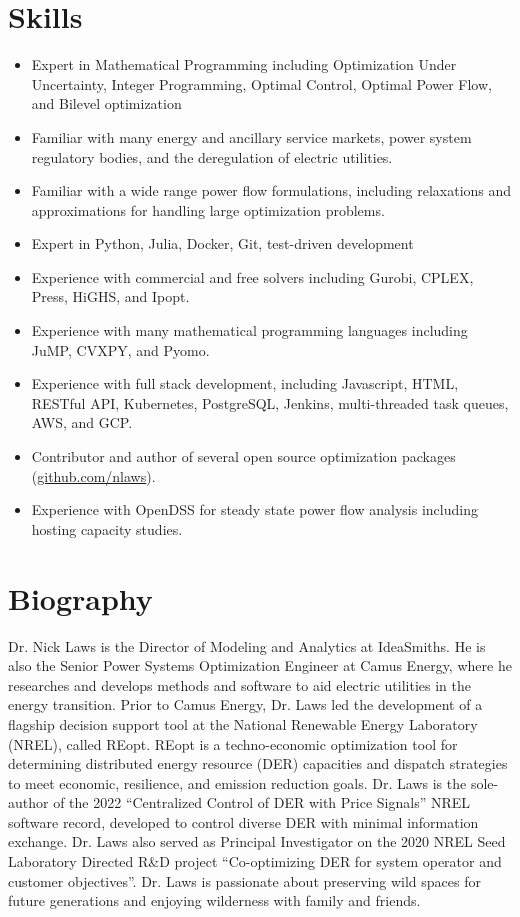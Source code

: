 \documentclass[a4paper,12pt]{report}
\begin{document}
\section*{Skills}
\begin{itemize}
    \item Expert in Mathematical Programming including Optimization Under Uncertainty, Integer Programming, Optimal Control, Optimal Power Flow, and Bilevel optimization
    \item Familiar with many energy and ancillary service markets, power system regulatory bodies, and the deregulation of electric utilities.
    \item Familiar with a wide range power flow formulations, including relaxations and approximations for handling large optimization problems.
    \item Expert in Python, Julia, Docker, Git, test-driven development
    \item Experience with commercial and free solvers including Gurobi, CPLEX, Press, HiGHS, and Ipopt.
    \item Experience with many mathematical programming languages including JuMP, CVXPY, and Pyomo.
    \item Experience with full stack development, including Javascript, HTML, RESTful API, Kubernetes, PostgreSQL, Jenkins, multi-threaded task queues, AWS, and GCP.
    \item Contributor and author of several open source optimization packages ({\href{http://github.com/nlaws}{github.com/nlaws}}).
    \item Experience with OpenDSS for steady state power flow analysis including hosting capacity studies. 
\end{itemize}


\section*{Biography}
Dr. Nick Laws is the Director of Modeling and Analytics at IdeaSmiths. He is also the Senior Power
Systems Optimization Engineer at Camus Energy, where he researches and develops methods and software
to aid electric utilities in the energy transition. Prior to Camus Energy, Dr. Laws led the
development of a flagship decision support tool at the National Renewable Energy Laboratory (NREL),
called REopt. REopt is a techno-economic optimization tool for determining distributed energy
resource (DER) capacities and dispatch strategies to meet economic, resilience, and emission
reduction goals.  Dr. Laws is the sole-author of the 2022 “Centralized Control of DER with Price
Signals” NREL software record, developed to control diverse DER with minimal information exchange.
Dr. Laws also served as Principal Investigator on the 2020 NREL Seed Laboratory Directed R\&D project
“Co-optimizing DER for system operator and customer objectives”. Dr. Laws is passionate about
preserving wild spaces for future generations and enjoying wilderness with family and friends.
\end{document}
